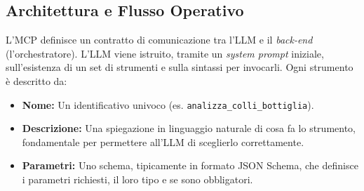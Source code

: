 \subsection{Architettura e Flusso Operativo}
L'MCP definisce un contratto di comunicazione tra l'LLM e il \textit{back-end} (l'orchestratore). L'LLM viene istruito, tramite un \textit{system prompt} iniziale, sull'esistenza di un set di strumenti e sulla sintassi per invocarli. Ogni strumento è descritto da:
\begin{itemize}
    \item \textbf{Nome:} Un identificativo univoco (es. \verb|analizza_colli_bottiglia|).
    \item \textbf{Descrizione:} Una spiegazione in linguaggio naturale di cosa fa lo strumento, fondamentale per permettere all'LLM di sceglierlo correttamente.
    \item \textbf{Parametri:} Uno schema, tipicamente in formato JSON Schema, che definisce i parametri richiesti, il loro tipo e se sono obbligatori.
\end{itemize}

